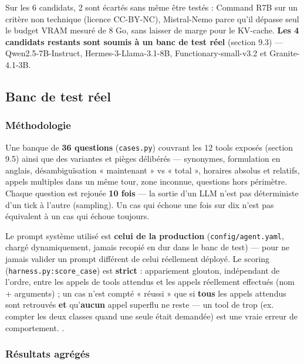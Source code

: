\documentclass[11pt,a4paper]{article}
\let\Oldsubsection\subsection
\renewcommand{\subsection}{\FloatBarrier\Oldsubsection}
\let\Oldsubsubsection\subsubsection
\renewcommand{\subsubsection}{\FloatBarrier\Oldsubsubsection}
\begin{document}
    Sur les 6 candidats, 2 sont écartés sans même être testés : Command
    R7B sur un critère non technique (licence CC-BY-NC), Mistral-Nemo
    parce qu'il dépasse seul le budget VRAM mesuré de 8 Go, sans laisser de
    marge pour le KV-cache. \textbf{Les 4 candidats restants sont soumis à
    un banc de test réel} (section 9.3) --- Qwen2.5-7B-Instruct, Hermes-3-Llama-3.1-8B,
    Functionary-small-v3.2 et Granite-4.1-3B.
    
    \subsection{Banc de test réel}
    
    \subsubsection{Méthodologie}
    
    Une banque de \textbf{36
    questions} (\texttt{cases.py}) couvrant les 12 tools exposés (section 9.5) ainsi que des variantes et pièges délibérés --- synonymes,
    formulation en anglais, désambiguïsation « maintenant » vs « total »,
    horaires absolus et relatifs, appels multiples dans un même tour, zone
    inconnue, questions hors périmètre.
    Chaque question est rejouée
    \textbf{10 fois} --- la sortie d'un LLM n'est pas déterministe d'un tick
    à l'autre (sampling). Un cas qui échoue une fois sur dix n'est pas
    équivalent à un cas qui échoue toujours.
    
    Le prompt système utilisé est \textbf{celui de la production}
    (\texttt{config/agent.yaml}, chargé dynamiquement, jamais recopié en
    dur dans le banc de test) --- pour ne jamais valider un prompt
    différent de celui réellement déployé. Le scoring
    (\texttt{harness.py:score\_case}) est \textbf{strict} : appariement
    glouton, indépendant de l'ordre, entre les appels de tools attendus et
    les appels réellement effectués (nom + arguments) ; un cas n'est
    compté « réussi » que si \textbf{tous} les appels attendus sont
    retrouvés \textbf{et} qu'\textbf{aucun} appel superflu ne reste --- un
    tool de trop (ex. compter les deux classes quand une seule était
    demandée) est une vraie erreur de comportement. .
    
    \subsubsection{Résultats agrégés}
    
\end{document}

